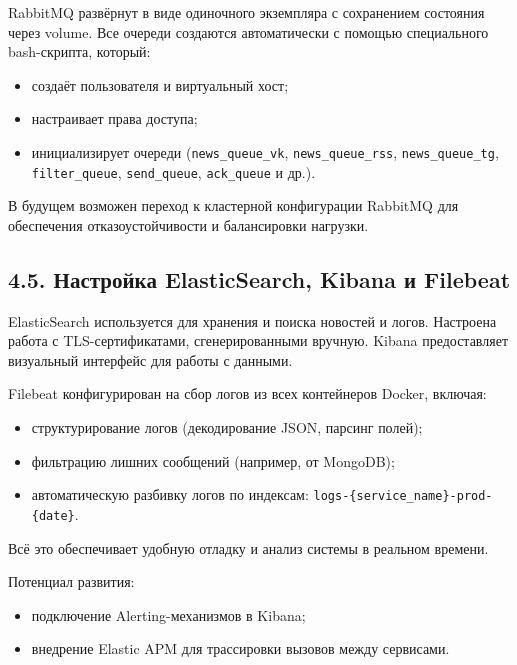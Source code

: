 RabbitMQ развёрнут в виде одиночного экземпляра с сохранением состояния
через volume. Все очереди создаются автоматически с помощью специального
bash-скрипта, который:

\begin{itemize}
\tightlist
\item
  создаёт пользователя и виртуальный хост;\\
\item
  настраивает права доступа;\\
\item
  инициализирует очереди (\texttt{news\_queue\_vk},
  \texttt{news\_queue\_rss}, \texttt{news\_queue\_tg},
  \texttt{filter\_queue}, \texttt{send\_queue}, \texttt{ack\_queue} и
  др.).
\end{itemize}

В будущем возможен переход к кластерной конфигурации RabbitMQ для
обеспечения отказоустойчивости и балансировки нагрузки.

\hypertarget{ux43dux430ux441ux442ux440ux43eux439ux43aux430-elasticsearch-kibana-ux438-filebeat}{%
\subsection{4.5. Настройка ElasticSearch, Kibana и
Filebeat}\label{ux43dux430ux441ux442ux440ux43eux439ux43aux430-elasticsearch-kibana-ux438-filebeat}}

ElasticSearch используется для хранения и поиска новостей и логов.
Настроена работа с TLS-сертификатами, сгенерированными вручную. Kibana
предоставляет визуальный интерфейс для работы с данными.

Filebeat конфигурирован на сбор логов из всех контейнеров Docker,
включая:

\begin{itemize}
\tightlist
\item
  структурирование логов (декодирование JSON, парсинг полей);\\
\item
  фильтрацию лишних сообщений (например, от MongoDB);\\
\item
  автоматическую разбивку логов по индексам:
  \texttt{logs-\{service\_name\}-prod-\{date\}}.
\end{itemize}

Всё это обеспечивает удобную отладку и анализ системы в реальном
времени.

Потенциал развития:

\begin{itemize}
\tightlist
\item
  подключение Alerting-механизмов в Kibana;\\
\item
  внедрение Elastic APM для трассировки вызовов между сервисами.
\end{itemize}

